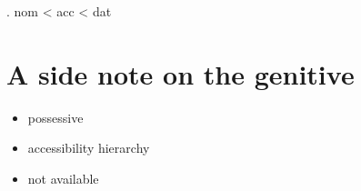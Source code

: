\ex. \ac{nom} < \ac{acc} < \ac{dat}

\phantom{nom}




\section{A side note on the genitive}

\begin{itemize}
  \item possessive
  \item accessibility hierarchy
  \item not available
\end{itemize}
